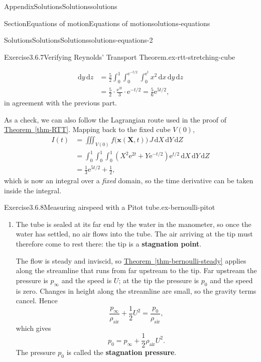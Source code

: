 \documentclass[oneside,10pt,]{book}
\newcommand{\xreffont}{\relax}
\newcommand{\ptxterminology}[1]{\textbf{#1}}
\numberwithin{equation}{section}
\newcommand{\e}{\mathrm{e}}
\newcommand{\de}{\mathrm{d}}
\newcommand{\bx}{\boldsymbol{x}}
\newcommand{\bX}{\boldsymbol{X}}
\begin{document}
\begin{appendixptx}{Appendix}{Solutions}{}{Solutions}{}{}{solutions}
\begin{sectionptx}{Section}{Equations of motion}{}{Equations of motion}{}{}{solutions-equations}
\begin{solutions-subsection-numberless}{Solutions}{Solutions}{}{Solutions}{}{}{solutions-equations-2}
\begin{divisionsolution}{Exercise}{3.6.7}{Verifying Reynolds' Transport Theorem.}{ex-rtt-stretching-cube}
\begin{enumerate}[font=\bfseries,label=(\alph*),ref=\alph*]
\begin{align*}
\de{y} \, \de{z}
&= \frac52 \int_0^1 \int_0^{\e^{-t/2}} \int_0^{\e^{t}} x^2 \, \de{x} \,
\de{y} \, \de{z}\\
&= \frac52 \cdot \frac{\e^{3t}}{3} \cdot \e^{-t/2} = \frac56
\e^{5t/2},
\end{align*}
in agreement with the previous part.%
\par
As a check, we can also follow the Lagrangian route used in the proof of \hyperref[thm-RTT]{Theorem~{\xreffont\ref{thm-RTT}}}. Mapping back to the fixed cube \(V(0)\),%
\begin{align*}
I(t) &= \iiint_{V(0)} f\big(\bx(\bX, t)\big) \, J \, \de{X} \, \de{Y} \,
\de{Z}\\
&= \int_0^1 \int_0^1 \int_0^1 \left( X^2 \e^{2t} + Y \e^{-t/2} \right)
\e^{t/2} \, \de{X} \, \de{Y} \, \de{Z}\\
&= \frac13 \e^{5t/2} + \frac12,
\end{align*}
which is now an integral over a \emph{fixed} domain, so the time derivative can be taken inside the integral.%
\end{enumerate}%
\end{divisionsolution}%
\begin{divisionsolution}{Exercise}{3.6.8}{Measuring airspeed with a Pitot tube.}{ex-bernoulli-pitot}%
\begin{enumerate}[font=\bfseries,label=(\alph*),ref=\alph*]%
\item[(a)]\noindent\hypertarget{ex-bernoulli-pitot-3-3-main}{}The tube is sealed at its far end by the water in the manometer, so once the water has settled, no air flows into the tube. The air arriving at the tip must therefore come to rest there: the tip is a \ptxterminology{stagnation point}.%
\par
The flow is steady and inviscid, so \hyperref[thm-bernoulli-steady]{Theorem~{\xreffont\ref{thm-bernoulli-steady}}} applies along the streamline that runs from far upstream to the tip. Far upstream the pressure is \(p_\infty\) and the speed is \(U\); at the tip the pressure is \(p_0\) and the speed is zero. Changes in height along the streamline are small, so the gravity terms cancel. Hence%
\begin{equation*}
\frac{p_\infty}{\rho_\text{air}} + \frac12 U^2 = \frac{p_0}{\rho_\text{air}},
\end{equation*}
which gives%
\begin{equation*}
p_0 = p_\infty + \frac12 \rho_\text{air} U^2.
\end{equation*}
The pressure \(p_0\) is called the \ptxterminology{stagnation pressure}.%

\end{enumerate}
\end{divisionsolution}
\end{solutions-subsection-numberless}
\end{sectionptx}
\end{appendixptx}
\end{document}

